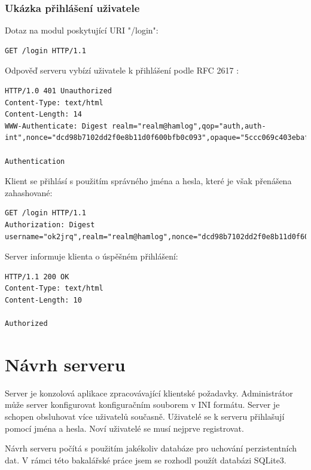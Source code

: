 \subsubsection{Ukázka přihlášení uživatele}

Dotaz na modul poskytující URI "/login":
\begin{verbatim}
GET /login HTTP/1.1

\end{verbatim}

Odpověď serveru vybízí uživatele k přihlášení podle RFC 2617 \cite{rfc2617}:
\begin{verbatim}
HTTP/1.0 401 Unauthorized
Content-Type: text/html
Content-Length: 14
WWW-Authenticate: Digest realm="realm@hamlog",qop="auth,auth-int",nonce="dcd98b7102dd2f0e8b11d0f600bfb0c093",opaque="5ccc069c403ebaf9f0171e9517f40e41"

Authentication
\end{verbatim}

Klient se přihlásí s použitím správného jména a hesla, které je však přenášena
zahashované:
\begin{verbatim}
GET /login HTTP/1.1
Authorization: Digest username="ok2jrq",realm="realm@hamlog",nonce="dcd98b7102dd2f0e8b11d0f600bfb0c093",uri="/login",qop=auth,response="d197141dc972c02d71e6a73b3396ed53",opaque="5ccc069c403ebaf9f0171e9517f40e41")

\end{verbatim}

Server informuje klienta o úspěšném přihlášení:
\begin{verbatim}
HTTP/1.1 200 OK
Content-Type: text/html
Content-Length: 10

Authorized
\end{verbatim}

\section{Návrh serveru}
\label{navrh_server}

Server je konzolová aplikace %
zpracovávající klientské požadavky. Administrátor může server konfigurovat konfiguračním souborem
v INI formátu. %
Server je schopen obsluhovat více uživatelů současně.
Uživatelé se k serveru přihlašují pomocí jména a hesla. Noví uživatelé se musí nejprve registrovat.

Návrh serveru počítá s použitím jakékoliv databáze pro uchování perzistentních dat. V rámci této bakalářské práce jsem se 
rozhodl použít databázi SQLite3.

